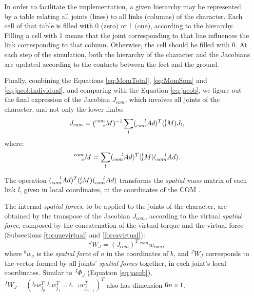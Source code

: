 \documentclass[tog]{acmsiggraph}
\begin{document}
In order to facilitate the implementation, a given hierarchy may be represented by a table relating all joints (lines) to all links (columns) of the 
character. Each cell of that table is filled with 0 (zero) or 1 (one), according to the hierarchy. Filling a cell with 1 means that the joint
corresponding to that line influences the link corresponding to that column. Otherwise, the cell should be filled with 0. At each step of 
the simulation, both the hierarchy of the character and the Jacobians are updated according to the contacts between the feet and the ground.

Finally, combining the Equations \ref{eq:MomTotal}, \ref{eq:MomSom} and \ref{eq:jacobIndividual}, and comparing with the Equation \ref{eq:jacob},
we figure out the final expression of the Jacobian $J_{com}$,
which involves all joints of the character, and not only the lower limbs:
%
\begin{equation}
 J_{com} = (\prescript{com}{c}{M})^{-1} \sum_l (\prescript{l}{com}{Ad})^{T} (_{l}^{l}M) J_{l},
\end{equation}
%
where:
%
\begin{equation}
 \prescript{com}{c}{M} = \sum_l (\prescript{l}{com}{Ad})^{T} (_{l}^{l}M) (\prescript{l}{com}{Ad}).
\end{equation}
%

The operation $(\prescript{l}{com}{Ad})^{T} (_{l}^{l}M) (\prescript{l}{com}{Ad})$ transforms the \textit{spatial mass} matrix of each
link $l$, given in local coordinates, in the coordinates of the COM \cite{bib:NunesTese12}.

The internal \textit{spatial forces}, to be applied to the joints of the character, are obtained by the transpose of the Jacobian $J_{com}$, according to
the virtual \textit{spatial force}, composed by the concatenation of the virtual torque and the virtual force (Subsections \ref{torquevirtual} and \ref{forcavirtual}):
%
\begin{equation}
 ^{J}W_{J} = (J_{com})^T ~ ^{com}w_{com},
\label{eq:jacobTransp}
\end{equation}
%
where $^b{w}_a$ is the \textit{spatial force} of $a$ in the coordinates of $b$, and $^{J}W_{J}$ corresponds to the vector formed by all joints'
\textit{spatial forces} together, in each joint's local coordinates.
Similar to $^{J}\Phi_{J}$ (Equation \ref{eq:jacob}), $^{J}W_{J} = \left( ^{j_{0}}w_{j_{0}}^T ~ ^{j_{1}}w_{j_{1}}^T ~ ... ~ ^{j_{n-1}}w_{j_{n-1}}^T \right)^T$
also has dimension $6n\times1$.
\end{document}
